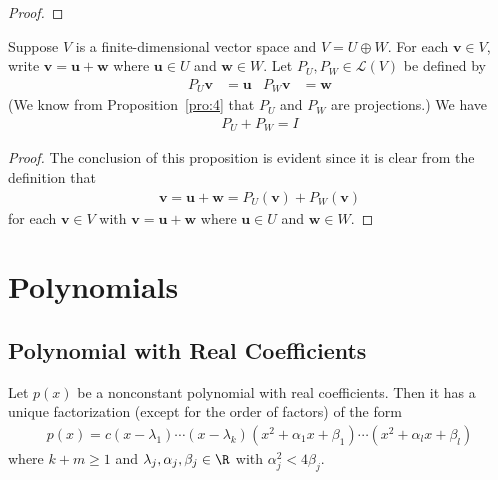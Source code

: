 \documentclass[thmcnt=section, color=blue, 12pt]{my-elegantbook}
\begin{document}
\begin{proof}
\end{proof}


\begin{proposition} \label{pro:5}
    Suppose $V$ is a finite-dimensional vector space and $V = U \oplus W$. For each $\mathbf{v} \in V$, write $\mathbf{v} = \mathbf{u} + \mathbf{w}$ where $\mathbf{u} \in U$ and $\mathbf{w} \in W$. Let $P_U, P_W \in \mathcal{L}(V)$ be defined by 
    \begin{align*}
        P_U \mathbf{v} &= \mathbf{u} & 
        P_W \mathbf{v} &= \mathbf{w}
    \end{align*}
    (We know from Proposition~\ref{pro:4} that $P_U$ and $P_W$ are projections.) We have 
    \begin{align*}
        P_U + P_W = I
    \end{align*}
\end{proposition}

\begin{proof}
    The conclusion of this proposition is evident since it is clear from the definition that 
    \begin{align*}
        \mathbf{v} = \mathbf{u} + \mathbf{w}
        = P_U(\mathbf{v}) + P_W(\mathbf{v})
    \end{align*}
    for each $\mathbf{v} \in V$ with $\mathbf{v} = \mathbf{u} + \mathbf{w}$ where $\mathbf{u} \in U$ and $\mathbf{w} \in W$.
\end{proof}


\chapter{Polynomials}


\section{Polynomial with Real Coefficients}


\begin{theorem} \label{thm:5}
    Let $p(x)$ be a nonconstant polynomial with real coefficients. Then it has a unique factorization (except for the order of factors) of the form 
    \begin{align*}
        p(x) = c (x - \lambda_1) \cdots (x - \lambda_k) 
        (x^2 + \alpha_1 x + \beta_1) \cdots (x^2 + \alpha_l x + \beta_l)
    \end{align*}
    where $k + m \geq 1$ and $\lambda_j, \alpha_j, \beta_j \in \R$ with $\alpha_j^2 < 4\beta_j$.
\end{theorem}
\end{document}
